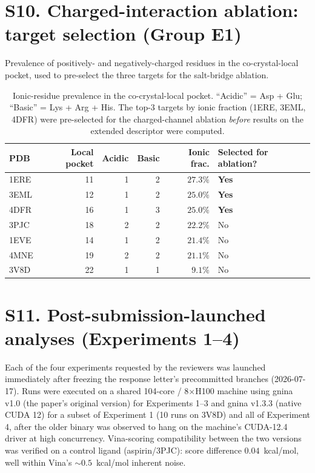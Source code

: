 \documentclass[journal=jcisd8,manuscript=suppinfo]{achemso}
\begin{document}
\section*{S10. Charged-interaction ablation: target selection (Group E1)}

Prevalence of positively- and negatively-charged residues in the co-crystal-local pocket, used to pre-select the three targets for the salt-bridge ablation.

\begin{table}[ht]
\centering
\caption{Ionic-residue prevalence in the co-crystal-local pocket. ``Acidic'' = Asp + Glu; ``Basic'' = Lys + Arg + His. The top-3 targets by ionic fraction (1ERE, 3EML, 4DFR) were pre-selected for the charged-channel ablation \emph{before} results on the extended descriptor were computed.}
\label{tab:salt_bridge}
\begin{tabular}{lrrrrl}
\toprule
\textbf{PDB} & \textbf{Local pocket} & \textbf{Acidic} & \textbf{Basic} & \textbf{Ionic frac.} & \textbf{Selected for ablation?} \\
\midrule
1ERE & 11 & 1 & 2 & $27.3\%$ & \textbf{Yes} \\
3EML & 12 & 1 & 2 & $25.0\%$ & \textbf{Yes} \\
4DFR & 16 & 1 & 3 & $25.0\%$ & \textbf{Yes} \\
3PJC & 18 & 2 & 2 & $22.2\%$ & No \\
1EVE & 14 & 1 & 2 & $21.4\%$ & No \\
4MNE & 19 & 2 & 2 & $21.1\%$ & No \\
3V8D & 22 & 1 & 1 & $9.1\%$  & No \\
\bottomrule
\end{tabular}
\end{table}

\section*{S11. Post-submission-launched analyses (Experiments 1--4)}

Each of the four experiments requested by the reviewers was launched immediately after freezing the response letter's precommitted branches (2026-07-17). Runs were executed on a shared 104-core / 8$\times$H100 machine using gnina v1.0 (the paper's original version) for Experiments 1--3 and gnina v1.3.3 (native CUDA 12) for a subset of Experiment 1 (10 runs on 3V8D) and all of Experiment 4, after the older binary was observed to hang on the machine's CUDA-12.4 driver at high concurrency. Vina-scoring compatibility between the two versions was verified on a control ligand (aspirin/3PJC): score difference $0.04$~kcal/mol, well within Vina's $\sim 0.5$~kcal/mol inherent noise.
\end{document}
